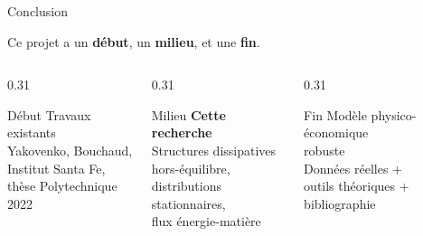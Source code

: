\documentclass[aspectratio=169]{beamer}
\begin{document}
	\begin{frame}[t]{Conclusion}
		\vspace{-0.3em}%
		\begin{block}{}
			\centering\small
			Ce projet a un \textbf{début}, un \textbf{milieu}, et une \textbf{fin}.
		\end{block}
		\vspace{0.1em}%
		\begin{columns}[T]
			\begin{column}{0.31\textwidth}
				\begin{block}{\centering Début}
					\footnotesize\centering
					Travaux existants\\[0.2em]
					Yakovenko, Bouchaud,\\
					Institut Santa Fe,\\
					thèse Polytechnique 2022
				\end{block}
			\end{column}
			\begin{column}{0.31\textwidth}
				\begin{block}{\centering Milieu}
					\footnotesize\centering
					\textbf{Cette recherche}\\[0.2em]
					Structures dissipatives\\
					hors-équilibre,\\
					distributions stationnaires,\\
					flux énergie-matière
				\end{block}
			\end{column}
			\begin{column}{0.31\textwidth}
				\begin{block}{\centering Fin}
					\footnotesize\centering
					Modèle physico-économique\\
					robuste\\[0.2em]
					Données réelles +\\
					outils théoriques +\\
					bibliographie
				\end{block}
			\end{column}
		\end{columns}%
		

\end{frame}
\end{document}
